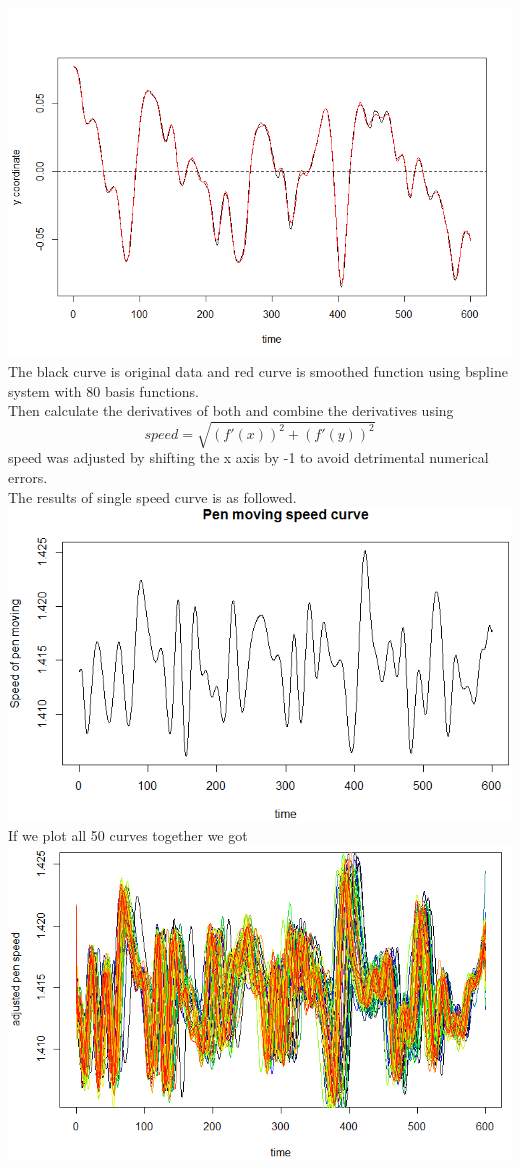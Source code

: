 \documentclass[11pt]{scrartcl}
\begin{document}
\includegraphics[scale=0.7]{fp03.png}\\
The black curve is original data and red curve is smoothed function using bspline system with 80 basis functions.\\
Then calculate the derivatives of both and combine the derivatives using
$$
speed=\sqrt{(f'(x))^2+(f'(y))^2}
$$
speed was adjusted by shifting the x axis by -1 to avoid detrimental numerical errors.\\
The results of single speed curve is as followed.\\
\includegraphics[scale=0.7]{fp04.png}\\
If we plot all 50 curves together we got\\
\includegraphics[scale=0.7]{fp02.png}\\
\end{document}
